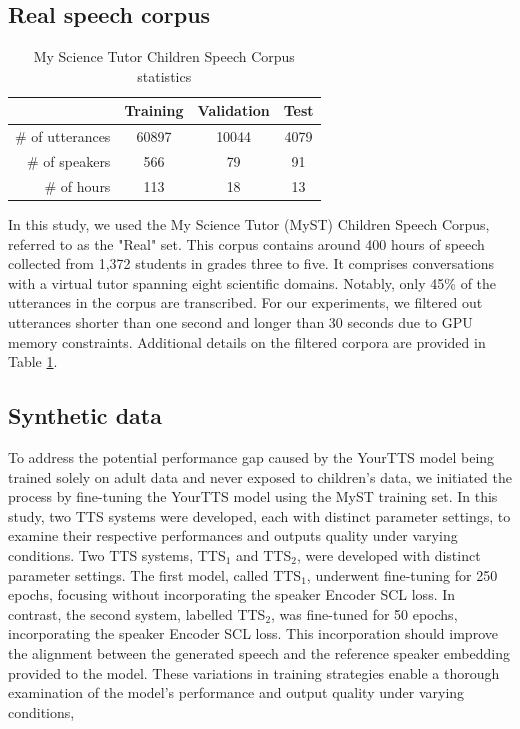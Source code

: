 \subsection{Real speech corpus}
\begin{table}[h!]
\caption{My Science Tutor Children Speech Corpus statistics}

\begin{center}
\begin{tabular}{r|c|c|c}
\hline
 & Training & Validation     & Test   \\ \hline
\# of utterances & 60897   & 10044    & 4079  \\ 
\# of speakers & 566   & 79    & 91  \\ 
\# of hours & 113   & 18    & 13  \\ \hline
\end{tabular}
\label{tab:statistics}
\end{center}
\end{table}
In this study, we used the My Science Tutor (MyST) Children Speech Corpus, referred to as the "Real" set. This corpus contains around 400 hours of speech collected from 1,372 students in grades three to five. It comprises conversations with a virtual tutor spanning eight scientific domains. 
Notably, only 45\% of the utterances in the corpus are transcribed. For our experiments, we filtered out utterances shorter than one second and longer than 30 seconds due to GPU memory constraints. Additional details on the filtered corpora are provided in Table \ref{tab:statistics}.

\subsection{Synthetic data}
To address the potential performance gap caused by the YourTTS model being trained solely on adult data and never exposed to children's data, we initiated the process by fine-tuning the YourTTS model using the MyST training set. In this study, two \ac{TTS} systems were developed, each with distinct parameter settings, to examine their respective performances and outputs quality under varying conditions. Two \ac{TTS} systems, TTS$_1$ and TTS$_2$, were developed with distinct parameter settings. The first model, called TTS$_1$, underwent fine-tuning for 250 epochs, focusing without incorporating the speaker Encoder \ac{SCL} loss. In contrast, the second system, labelled TTS$_2$, was fine-tuned for 50 epochs, incorporating the speaker Encoder \ac{SCL} loss. This incorporation should improve the alignment between the generated speech and the reference speaker embedding provided to the model. These variations in training strategies enable a thorough examination of the model's performance and output quality under varying conditions,

